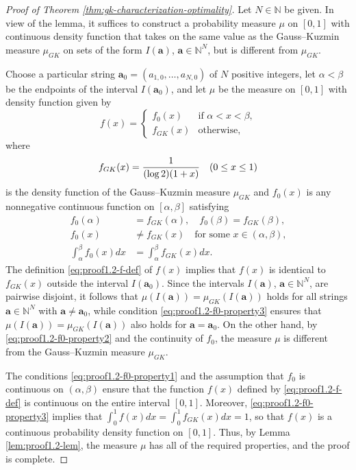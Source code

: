 \documentclass[10pt]{article}
\theoremstyle{definition}
\numberwithin{equation}{section}
\numberwithin{lemma}{section}
\newcommand{\NN}{\mathbb{N}}
\newcommand{\bfa}{\mathbf{a}}
\begin{document}
\begin{proof}[Proof of Theorem 
\ref{thm:gk-characterization-optimality}]
Let $N\in\NN$ be given.  In view of the lemma, it suffices to construct
a probability measure $\mu$ on $[0,1]$ with continuous density function
that takes on the same value as the Gauss--Kuzmin measure $\mu_{GK}$ on
sets of the form $I(\bfa)$, $\bfa\in\NN^N$, 
but is different from $\mu_{GK}$. 

Choose a
particular string $\bfa_0=(a_{1,0},\dots,a_{N,0})$ of $N$ positive integers,
let $\alpha<\beta$ be the endpoints of the interval
$I(\bfa_0)$, and let $\mu$ be the measure on $[0,1]$ with density function  
given by
\begin{equation}
\label{eq:proof1.2-f-def}
f(x)=\begin{cases}
f_0(x)&\text{if 
$\alpha<x<\beta$,}
\\
f_{GK}(x) &\text{otherwise,}
\end{cases}
\end{equation}
where 
\begin{equation}
\notag
f_{GK}(x)=\frac{1}{(\log 2)(1+x)}\quad (0\le x\le 1)
\end{equation}
is the density function of the Gauss--Kuzmin measure $\mu_{GK}$ and 
$f_0(x)$ is any nonnegative continuous function on
$[\alpha,\beta]$ satisfying 
\begin{align}
\label{eq:proof1.2-f0-property1}
f_0(\alpha)&=f_{GK}(\alpha),\quad f_0(\beta)=f_{GK}(\beta),
\\
\label{eq:proof1.2-f0-property2}
f_0(x)&\not=f_{GK}(x)\quad \text{for some $x\in(\alpha,\beta)$,}
\\
\label{eq:proof1.2-f0-property3}
\int_{\alpha}^{\beta}f_0(x)dx&=\int_{\alpha}^{\beta}f_{GK}(x)dx.
\end{align}
The definition \eqref{eq:proof1.2-f-def} of $f(x)$ implies that  
$f(x)$ is identical to $f_{GK}(x)$
outside the interval $I(\bfa_0)$. Since the intervals $I(\bfa)$,
$\bfa\in\NN^N$, are pairwise disjoint, it follows that
$\mu(I(\bfa))=\mu_{GK}(I(\bfa))$ holds for all strings $\bfa\in\NN^N$
with $\bfa\not=\bfa_0$, while condition \eqref{eq:proof1.2-f0-property3}
ensures that $\mu(I(\bfa))=\mu_{GK}(I(\bfa))$ also holds for $\bfa=\bfa_0$.
On the other hand, by  \eqref{eq:proof1.2-f0-property2} and the
continuity of $f_0$, the measure $\mu$ is different from the
Gauss--Kuzmin measure $\mu_{GK}$. 

The conditions \eqref{eq:proof1.2-f0-property1} and the
assumption that $f_0$ is continuous on $(\alpha,\beta)$ ensure that the
function $f(x)$ defined by \eqref{eq:proof1.2-f-def} is continuous on
the entire interval $[0,1]$.  Moreover, \eqref{eq:proof1.2-f0-property3}
implies that $\int_0^1f(x)dx=\int_0^1f_{GK}(x)dx=1$, so that $f(x)$ is a
continuous probability density function on $[0,1]$.  Thus, 
by Lemma \ref{lem:proof1.2-lem},
the measure
$\mu$ has all of the required properties, and the proof is complete.
\end{proof}
\end{document}

